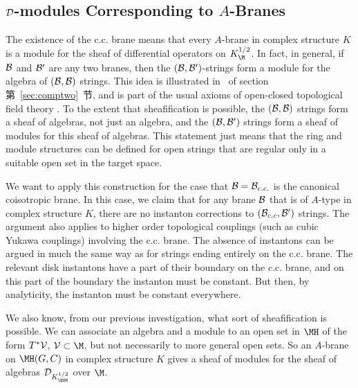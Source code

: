 
\subsection{${\cal D}$-modules Corresponding to $A$-Branes}
\label{sec:dmab}

 

The existence of the c.c. brane means that every $A$-brane in
complex structure $K$ is a module for the sheaf of differential
operators on $K_\M^{1/2}$.  In fact, in general, if ${\cal B}$ and
${\cal B}'$ are any two branes, then the $({\cal B},{\cal
B}')$-strings form a module for the algebra of $({\cal B},{\cal
B})$ strings.  This idea is illustrated in \dunamp\ of section
第~\ref{sec:comptwo}~节, and is part of the usual axioms of open-closed
topological field theory \cite{ref142,ref143}. To the
extent that sheafification is possible, the $({\cal B},{\cal B})$
strings form a sheaf of algebras, not just an  algebra, and the
$({\cal B},{\cal B}')$ strings form a sheaf of modules for this
sheaf of algebras. This statement just means that the ring and
module structures can be defined for open strings that are regular
only in a suitable open set in the target space.

We want to apply this construction for the case that ${\cal
B}={\cal B}_{c.c.}$ is the canonical coisotropic brane.  In this
case, we claim that for any brane ${\cal B}$ that is of $A$-type
in complex structure $K$, there are no instanton corrections to
$({\cal B}_{c.c},{\cal B}')$ strings.  The argument also applies
to higher order topological couplings (such as cubic Yukawa
couplings) involving the c.c. brane. The absence of instantons can
be argued in much the same way as for strings ending entirely on
the c.c. brane. The relevant disk instantons have a part of their
boundary on the c.c. brane, and on this part of the boundary the
instanton must be constant. But then, by analyticity, the
instanton must be constant everywhere.

We also know, from our previous investigation,  what sort of
sheafification is possible.  We can associate an algebra and a
module to an open set in $\MH$ of the form $T^*{{\cal V}}$,
${{\cal V}}\subset \M$, but not necessarily to more general open
sets. So an $A$-brane on $\MH(G,C)$ in complex structure $K$ gives
a sheaf of modules for the sheaf of algebras ${\cal D}_{K_{
\EUM}^{1/2}}$ over $\M$.

